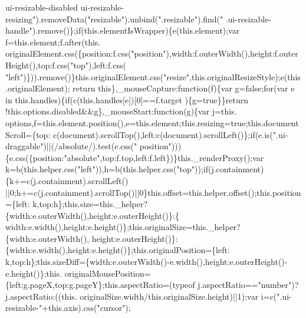 \begin{DoxyCode}
{       ui-resizable-disabled ui-resizable-resizing"}).removeData(\textcolor{stringliteral}{"resizable"}).unbind(\textcolor{stringliteral}{".resizable"}).find(\textcolor{stringliteral}{"
      .ui-resizable-handle"}).remove()\};\textcolor{keywordflow}{if}(this.elementIsWrapper)\{e(this.element);var f=this.element;f.after(this.
      originalElement.css(\{position:f.css(\textcolor{stringliteral}{"position"}),width:f.outerWidth(),height:f.outerHeight(),top:f.css(\textcolor{stringliteral}{"top"}),left:f.css(\textcolor{stringliteral}{
      "left"})\})).\textcolor{keyword}{remove}()\}this.originalElement.css(\textcolor{stringliteral}{"resize"},this.originalResizeStyle);e(this.originalElement);\textcolor{keywordflow}{
      return} \textcolor{keyword}{this}\},\_mouseCapture:\textcolor{keyword}{function}(f)\{var g=\textcolor{keyword}{false};\textcolor{keywordflow}{for}(var e in this.handles)\{\textcolor{keywordflow}{if}(c(this.handles[e])[0]==f.target
      )\{g=\textcolor{keyword}{true}\}\}\textcolor{keywordflow}{return} !this.options.disabled&&g\},\_mouseStart:\textcolor{keyword}{function}(g)\{var j=this.
      options,f=this.element.position(),e=this.element;this.resizing=\textcolor{keyword}{true};this.documentScroll=\{top:
      c(document).scrollTop(),left:c(document).scrollLeft()\};\textcolor{keywordflow}{if}(e.is(\textcolor{stringliteral}{".ui-draggable"})||(/absolute/).test(e.css(\textcolor{stringliteral}{"
      position"})))\{e.css(\{position:\textcolor{stringliteral}{"absolute"},top:f.top,left:f.left\})\}this.\_renderProxy();var 
      k=b(this.helper.css(\textcolor{stringliteral}{"left"})),h=b(this.helper.css(\textcolor{stringliteral}{"top"}));\textcolor{keywordflow}{if}(j.containment)\{k+=c(j.containment).scrollLeft()
      ||0;h+=c(j.containment).scrollTop()||0\}this.offset=this.helper.offset();this.position=\{left:
      k,top:h\};this.size=this.\_helper?\{width:e.outerWidth(),height:e.outerHeight()\}:\{
      width:e.width(),height:e.height()\};this.originalSize=this.\_helper?\{width:e.outerWidth(),
      height:e.outerHeight()\}:\{width:e.width(),height:e.height()\};this.originalPosition=\{left:
      k,top:h\};this.sizeDiff=\{width:e.outerWidth()-e.width(),height:e.outerHeight()-e.height()\};this.
      originalMousePosition=\{left:g.pageX,top:g.pageY\};this.aspectRatio=(typeof j.aspectRatio==\textcolor{stringliteral}{"number"})?j.aspectRatio:((\textcolor{keyword}{this}.
      originalSize.width/\textcolor{keyword}{this}.originalSize.height)||1);var i=c(\textcolor{stringliteral}{".ui-resizable-"}+this.axis).css(\textcolor{stringliteral}{"cursor"});

\end{DoxyCode}
